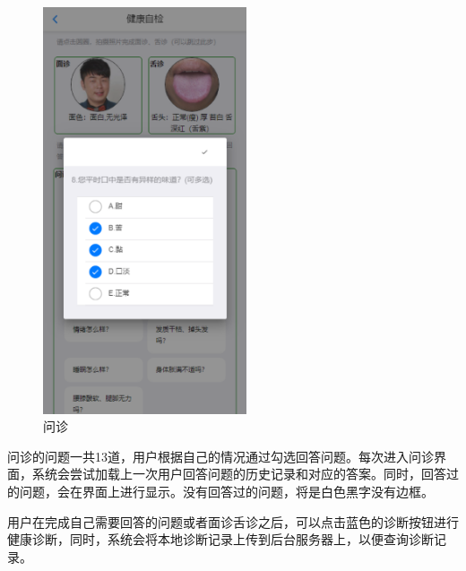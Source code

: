 \begin{figure}[ht]
    \centering
    \includegraphics[height=12cm]{images/questions.png}
    \caption{问诊}
    \label{fig:questions}
\end{figure}
问诊的问题一共13道，用户根据自己的情况通过勾选回答问题。每次进入问诊界面，系统会尝试加载上一次用户回答问题的历史记录和对应的答案。同时，回答过的问题，会在界面上进行显示。没有回答过的问题，将是白色黑字没有边框。


用户在完成自己需要回答的问题或者面诊舌诊之后，可以点击蓝色的诊断按钮进行健康诊断，同时，系统会将本地诊断记录上传到后台服务器上，以便查询诊断记录。


